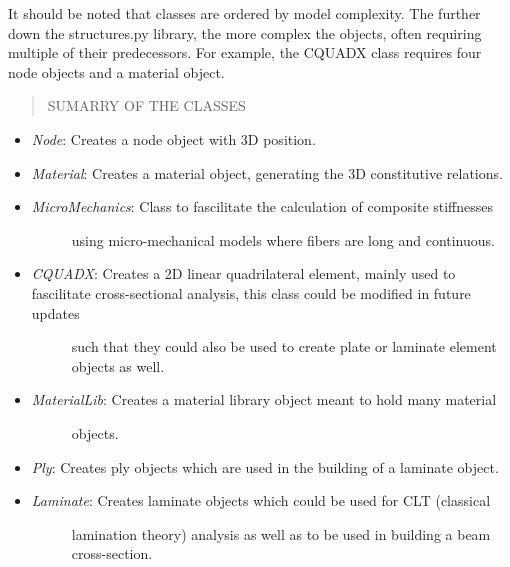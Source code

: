 \documentclass[letterpaper,10pt,english]{sphinxmanual}
\begin{document}
It should be noted that classes are ordered by model complexity. The further
down the structures.py library, the more complex the objects, often requiring
multiple of their predecessors. For example, the CQUADX class requires four
node objects and a material object.
\begin{quote}\begin{description}
\item[{SUMARRY OF THE CLASSES}] \leavevmode
\end{description}\end{quote}
\begin{itemize}
\item {} 
\emph{Node}: Creates a node object with 3D position.

\item {} 
\emph{Material}: Creates a material object, generating the 3D constitutive relations.

\item {} \begin{description}
\item[{\emph{MicroMechanics}: Class to fascilitate the calculation of composite stiffnesses}] \leavevmode
using micro-mechanical models where fibers are long and continuous.

\end{description}

\item {} \begin{description}
\item[{\emph{CQUADX}: Creates a 2D linear quadrilateral element, mainly used to fascilitate    cross-sectional analysis, this class could be modified in future updates}] \leavevmode
such that they could also be used to create plate or laminate element
objects as well.

\end{description}

\item {} \begin{description}
\item[{\emph{MaterialLib}: Creates a material library object meant to hold many material}] \leavevmode
objects.

\end{description}

\item {} 
\emph{Ply}: Creates ply objects which are used in the building of a laminate object.

\item {} \begin{description}
\item[{\emph{Laminate}: Creates laminate objects which could be used for CLT (classical}] \leavevmode
lamination theory) analysis as well as to be used in building a beam
cross-section.


\end{description}
\end{itemize}
\end{document}

